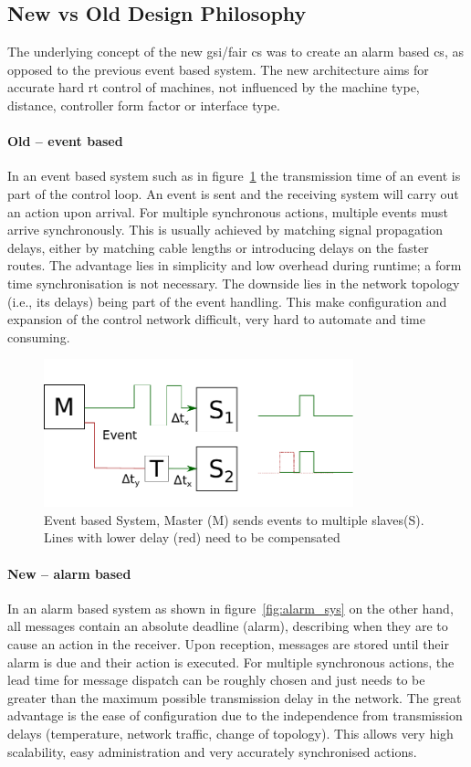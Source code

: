 \subsection{New vs Old Design Philosophy}
\label{ss:design_phil}
The underlying concept of the new \gls{gsi}/\gls{fair} \gls{cs} was to create an alarm based \gls{cs}, as opposed to the previous event based system.
The new architecture aims for accurate hard \gls{rt} control of machines, not influenced by the machine type, distance, controller form factor or interface type.
\paragraph{Old -- event based}
In an event based system such as in figure~\ref{fig:event_sys} the transmission time of an event is part of the control loop. An event is sent and the receiving system will carry out an action upon arrival. For multiple synchronous actions, multiple events must arrive
synchronously. This is usually achieved by matching signal propagation delays, either by matching cable lengths or introducing delays on the faster routes. The advantage lies in simplicity and low overhead during runtime; a form time synchronisation is not necessary. The downside lies in the network topology (i.e., its delays) being part of the event handling. This make configuration and expansion of the control network difficult, very hard to automate and time consuming.
\begin{figure}[H]
   \centering
   \includegraphics*[width=0.8\textwidth,keepaspectratio]{Figures/event_system}
   \caption{Event based System, Master (M) sends events to multiple slaves(S). Lines with lower delay (red) need to be compensated}
   \label{fig:event_sys}
\end{figure}
\paragraph{New -- alarm based}
In an alarm based system as shown in figure~\ref{fig:alarm_sys} on the other hand, all messages contain an absolute deadline (alarm), describing when they are to cause an action in the receiver. Upon reception, messages are stored until their alarm is due and their action is executed. For multiple synchronous actions, the lead time for message dispatch can be roughly chosen and just needs to be greater than the maximum possible transmission delay in the network. The great advantage is the ease of configuration due to the independence from transmission delays (temperature, network traffic, change of topology). This allows very high scalability, easy administration and very accurately synchronised actions.
